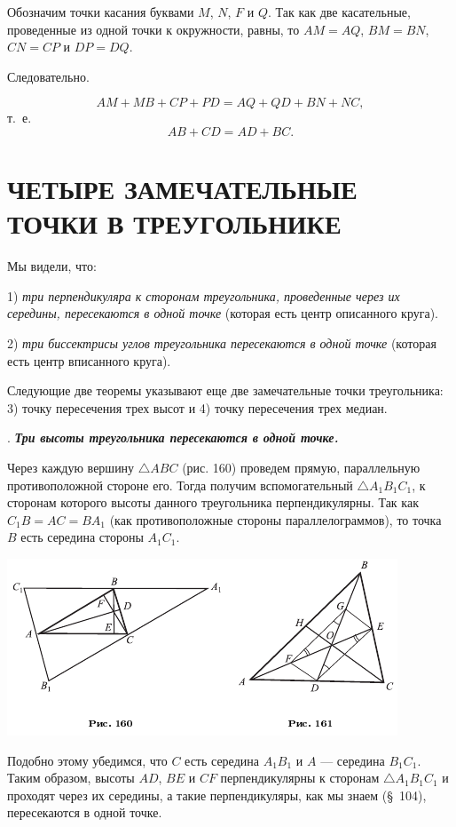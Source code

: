 \documentclass[oneside]{book}
\begin{document}
Обозначим точки касания буквами $M$, $N$, $F$ и $Q$.
Так как две касательные, проведенные из одной точки к окружности, равны, то $AM=AQ$, $BM=BN$, $CN=CP$ и $DP = DQ$.

Следовательно.

\[AM+MB+CP+PD = AQ + QD+BN+NC,\]
т.~е. 
\[AB+CD=AD+BC.\]

\section{ЧЕТЫРЕ ЗАМЕЧАТЕЛЬНЫЕ ТОЧКИ В ТРЕУГОЛЬНИКЕ}

Мы видели, что:

1) \emph{три перпендикуляра к сторонам треугольника, проведенные через их середины, пересекаются в одной точке} (которая есть центр описанного круга).

2) \emph{три биссектрисы углов треугольника пересекаются в одной точке} (которая есть центр вписанного круга).

Следующие две теоремы указывают еще две замечательные точки треугольника:
3) точку пересечения трех высот и 4) точку пересечения трех медиан.

.
\textbf{\emph{Три высоты треугольника пересекаются в одной точке.}}

Через каждую вершину $\triangle ABC$ (рис. 160) проведем прямую, параллельную противоположной стороне его.
Тогда получим вспомогательный $\triangle A_1B_1C_1$, к сторонам которого высоты данного треугольника перпендикулярны.
Так как $C_1B=AC=BA_1$ (как противоположные стороны параллелограммов), то точка $B$ есть середина стороны $A_1C_1$.

\includegraphics{pics/ris-160-161}

Подобно этому убедимся, что $C$ есть середина $A_1B_1$ и $A$ — середина $B_1C_1$.
Таким образом, высоты $AD$, $BE$ и $CF$ перпендикулярны к сторонам $\triangle A_1B_1C_1$ и проходят через их середины, а такие перпендикуляры, как мы знаем (§~104), пересекаются в одной точке.
\end{document}

